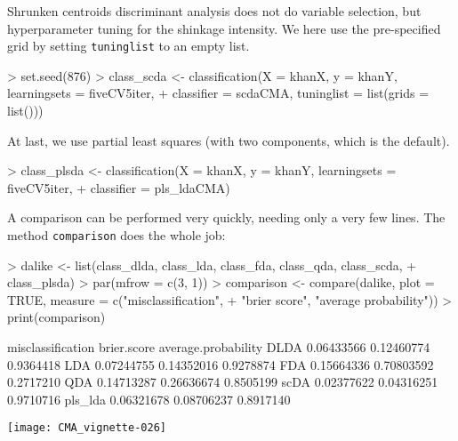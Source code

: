 Shrunken centroids discriminant analysis does not do variable selection, but
hyperparameter tuning for the shinkage intensity. We here use the pre-specified
grid by setting \texttt{tuninglist} to an empty list. 

\begin{Schunk}
\begin{Sinput}
> set.seed(876)
> class_scda <- classification(X = khanX, y = khanY, learningsets = fiveCV5iter, 
+     classifier = scdaCMA, tuninglist = list(grids = list()))
\end{Sinput}
\end{Schunk}
                             
At last, we use partial least squares (with two components, which is the default).

\begin{Schunk}
\begin{Sinput}
> class_plsda <- classification(X = khanX, y = khanY, learningsets = fiveCV5iter, 
+     classifier = pls_ldaCMA)
\end{Sinput}
\end{Schunk}

A comparison can be performed very quickly, needing only a very few lines. The method
\texttt{comparison} does the whole job: 

\begin{Schunk}
\begin{Sinput}
> dalike <- list(class_dlda, class_lda, class_fda, class_qda, class_scda, 
+     class_plsda)
> par(mfrow = c(3, 1))
> comparison <- compare(dalike, plot = TRUE, measure = c("misclassification", 
+     "brier score", "average probability"))
> print(comparison)
\end{Sinput}
\begin{Soutput}
        misclassification brier.score average.probability
DLDA           0.06433566  0.12460774           0.9364418
LDA            0.07244755  0.14352016           0.9278874
FDA            0.15664336  0.70803592           0.2717210
QDA            0.14713287  0.26636674           0.8505199
scDA           0.02377622  0.04316251           0.9710716
pls_lda        0.06321678  0.08706237           0.8917140
\end{Soutput}
\end{Schunk}
\texttt{[image: CMA\_vignette-026]}









